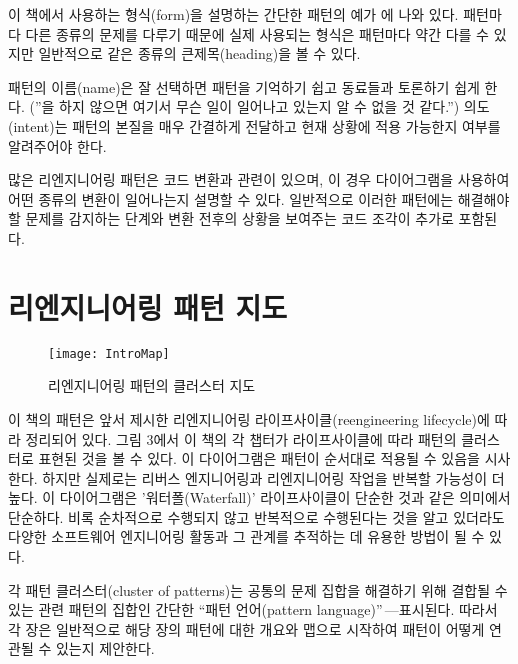 \documentclass[a4paper,10pt,twoside]{book}
\begin{document}
이 책에서 사용하는 형식(form)을 설명하는 간단한 패턴의 예가 에 나와 있다. 패턴마다 다른 종류의 문제를 다루기 때문에 실제 사용되는 형식은 패턴마다 약간 다를 수 있지만 일반적으로 같은 종류의 큰제목(heading)을 볼 수 있다.

패턴의 이름(name)은 잘 선택하면 패턴을 기억하기 쉽고 동료들과 토론하기 쉽게 한다. (''을 하지 않으면 여기서 무슨 일이 일어나고 있는지 알 수 없을 것 같다.'') 의도(intent)는 패턴의 본질을 매우 간결하게 전달하고 현재 상황에 적용 가능한지 여부를 알려주어야 한다. 

많은 리엔지니어링 패턴은 코드 변환과 관련이 있으며, 이 경우 다이어그램을 사용하여 어떤 종류의 변환이 일어나는지 설명할 수 있다. 일반적으로 이러한 패턴에는 해결해야 할 문제를 감지하는 단계와 변환 전후의 상황을 보여주는 코드 조각이 추가로 포함된다.

\section{리엔지니어링 패턴 지도}

\begin{figure}
\begin{center}
\texttt{[image: IntroMap]}
\caption{리엔지니어링 패턴의 클러스터 지도}
\end{center}
\end{figure}

이 책의 패턴은 앞서 제시한 리엔지니어링 라이프사이클(reengineering lifecycle)에 따라 정리되어 있다. 그림 3에서 이 책의 각 챕터가 라이프사이클에 따라 패턴의 클러스터로 표현된 것을 볼 수 있다. 이 다이어그램은 패턴이 순서대로 적용될 수 있음을 시사한다. 하지만 실제로는 리버스 엔지니어링과 리엔지니어링 작업을 반복할 가능성이 더 높다. 이 다이어그램은 '워터폴(Waterfall)' 라이프사이클이 단순한 것과 같은 의미에서 단순하다. 비록 순차적으로 수행되지 않고 반복적으로 수행된다는 것을 알고 있더라도 다양한 소프트웨어 엔지니어링 활동과 그 관계를 추적하는 데 유용한 방법이 될 수 있다.

각 패턴 클러스터(cluster of patterns)는 공통의 문제 집합을 해결하기 위해 결합될 수 있는 관련 패턴의 집합인 간단한 ``패턴 언어(pattern language)''\,---\로 표시된다. 따라서 각 장은 일반적으로 해당 장의 패턴에 대한 개요와 맵으로 시작하여 패턴이 어떻게 연관될 수 있는지 제안한다.

\end{document}
